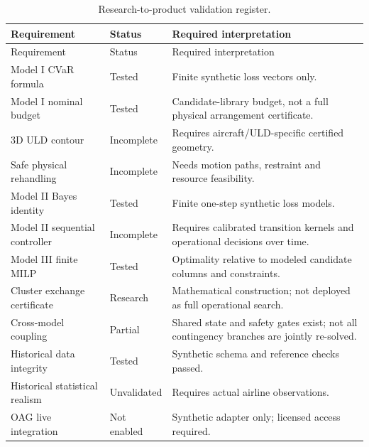 \documentclass[10pt,a4paper]{article}
\theoremstyle{plain}
\theoremstyle{definition}
\theoremstyle{remark}
\begin{document}
\begin{longtable}{@{}p{48mm}p{22mm}p{84mm}@{}}
\caption{
Research-to-product validation register.
}
\\
\toprule
Requirement & Status & Required interpretation \\
\midrule
\endfirsthead

\toprule
Requirement & Status & Required interpretation \\
\midrule
\endhead

Model I CVaR formula &
Tested &
Finite synthetic loss vectors only. \\

Model I nominal budget &
Tested &
Candidate-library budget,
not a full physical arrangement certificate. \\

3D ULD contour &
Incomplete &
Requires aircraft/ULD-specific
certified geometry. \\

Safe physical rehandling &
Incomplete &
Needs motion paths,
restraint and resource feasibility. \\

Model II Bayes identity &
Tested &
Finite one-step synthetic loss models. \\

Model II sequential controller &
Incomplete &
Requires calibrated transition kernels
and operational decisions over time. \\

Model III finite MILP &
Tested &
Optimality relative to modeled
candidate columns and constraints. \\

Cluster exchange certificate &
Research &
Mathematical construction;
not deployed as full operational search. \\

Cross-model coupling &
Partial &
Shared state and safety gates exist;
not all contingency branches are jointly re-solved. \\

Historical data integrity &
Tested &
Synthetic schema and reference checks passed. \\

Historical statistical realism &
Unvalidated &
Requires actual airline observations. \\

OAG live integration &
Not enabled &
Synthetic adapter only;
licensed access required. \\


\end{longtable}
\end{document}
